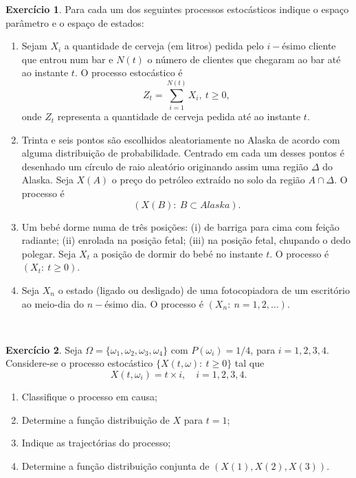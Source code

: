 \documentclass[
  11pt,
  a4paper,
]{book}
\theoremstyle{definition}
\theoremstyle{definition}
\theoremstyle{definition}
\newtheorem{exercise}{Exercício}[chapter]
\theoremstyle{definition}
\theoremstyle{remark}
\begin{document}
\begin{exercise}

Para cada um dos seguintes processos estocásticos indique o espaço parâmetro e o espaço de estados:

\begin{enumerate}
\def\labelenumi{(\alph{enumi})}
\item
  Sejam \(X_i\) a quantidade de cerveja (em litros) pedida pelo \(i-\)ésimo cliente que entrou num bar e \(N(t)\) o número de clientes que chegaram ao bar até ao instante \(t\). O processo estocástico é
  \[Z_t=\sum\limits_{i=1}^{N(t)}X_i, ~t \geq 0,\]
  onde \(Z_t\) representa a quantidade de cerveja pedida até ao instante \(t\).
\item
  Trinta e seis pontos são escolhidos aleatoriamente no Alaska de acordo com alguma distribuição de probabilidade. Centrado em cada um desses pontos é desenhado um círculo de raio aleatório originando assim uma região \(\Delta\) do Alaska. Seja \(X(A)\) o preço do petróleo extraído no solo da região \(A \cap \Delta\). O processo é
  \[(X(B): ~B \subset Alaska).\]
\item
  Um bebé dorme numa de três posições: (i) de barriga para cima com feição radiante; (ii) enrolada na posição fetal; (iii) na posição fetal, chupando o dedo polegar. Seja \(X_t\) a posição de dormir do bebé no instante \(t\). O processo é \((X_t: ~t\geq 0)\).
\item
  Seja \(X_n\) o estado (ligado ou desligado) de uma fotocopiadora de um escritório ao meio-dia do \(n-\)ésimo dia. O processo é \((X_n: ~ n =1, 2, \dots)\).
\end{enumerate}

\end{exercise}

\(\,\)

\begin{exercise}
\leavevmode

Seja \(\Omega = \{\omega_1, \omega_2, \omega_3, \omega_4\}\) com \(P(\omega_i) = 1/4\), para \(i = 1, 2, 3, 4\). Considere-se o processo estocástico \(\{X(t, \omega): ~ t \geq 0\}\) tal que
\[
X(t, \omega_i) = t \times i, \quad i = 1, 2, 3, 4.
\]

\begin{enumerate}
\def\labelenumi{(\alph{enumi})}
\item
  Classifique o processo em causa;
\item
  Determine a função distribuição de \(X\) para \(t = 1\);
\item
  Indique as trajectórias do processo;
\item
  Determine a função distribuição conjunta de \(\left(X(1), X(2), X(3)\right)\).
\end{enumerate}

\end{exercise}
\end{document}
